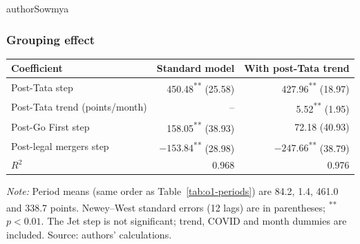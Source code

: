 \begin{mergedcontribution}{authorSowmya}
\subsubsection{Grouping effect}

\label{app:o1-wedge}

\begin{minipage}{\linewidth}
\label{tab:o1-gap}
\centering
{\small{}\setlength{\tabcolsep}{5pt}
\fontsize{10}{12}\selectfont{}\setlength{\tabcolsep}{3pt}
\renewcommand{\arraystretch}{1.15}
\begin{tabular}{|l|r|r|}
\hline
\textbf{Coefficient} & \textbf{Standard model} & \textbf{With post-Tata trend} \\
\hline
Post-Tata step & 450.48\textsuperscript{**} (25.58) & 427.96\textsuperscript{**} (18.97) \\
\hline
Post-Tata trend (points/month) & -- & 5.52\textsuperscript{**} (1.95) \\
\hline
Post-Go First step & 158.05\textsuperscript{**} (38.93) & 72.18 (40.93) \\
\hline
Post-legal mergers step & $-153.84$\textsuperscript{**} (28.98) & $-247.66$\textsuperscript{**} (38.79) \\
\hline
$R^2$ & 0.968 & 0.976 \\
\hline
\end{tabular}\par}
\vspace{4pt}
{\footnotesize{}\raggedright\textit{Note:} Period means (same order as Table~\ref{tab:o1-periods}) are 84.2, 1.4, 461.0 and 338.7 points. Newey--West standard errors (12 lags) are in parentheses; \textsuperscript{**}$p<0.01$. The Jet step is not significant; trend, COVID and month dummies are included. Source: authors' calculations.\par}
\end{minipage}
\end{mergedcontribution}
